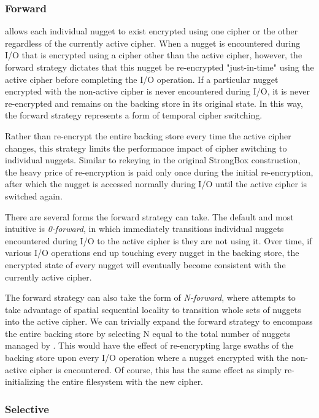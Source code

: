 \subsubsection{Forward}

\SYSTEM{} allows each individual nugget to exist encrypted using one cipher or
the other regardless of the currently active cipher. When a nugget is
encountered during I/O that is encrypted using a cipher other than the active
cipher, however, the forward strategy dictates that this nugget be re-encrypted
"just-in-time" using the active cipher before completing the I/O operation. If a
particular nugget encrypted with the non-active cipher is never encountered
during I/O, it is never re-encrypted and remains on the backing store in its
original state. In this way, the forward strategy represents a form of temporal
cipher switching.

Rather than re-encrypt the entire backing store every time the active cipher
changes, this strategy limits the performance impact of cipher switching to
individual nuggets. Similar to rekeying in the original StrongBox construction,
the heavy price of re-encryption is paid only once during the initial
re-encryption, after which the nugget is accessed normally during I/O until the
active cipher is switched again.

There are several forms the forward strategy can take. The default and most
intuitive is \emph{0-forward}, in which \SYSTEM{} immediately transitions
individual nuggets encountered during I/O to the active cipher is they are not
using it. Over time, if various I/O operations end up touching every nugget in
the backing store, the encrypted state of every nugget will eventually become
consistent with the currently active cipher.

The forward strategy can also take the form of \emph{N-forward}, where \SYSTEM{}
attempts to take advantage of spatial sequential locality to transition whole
sets of nuggets into the active cipher. We can trivially expand the forward
strategy to encompass the entire backing store by selecting N equal to the total
number of nuggets managed by \SYSTEM{}. This would have the effect of
re-encrypting large swaths of the backing store upon every I/O operation where a
nugget encrypted with the non-active cipher is encountered. Of course, this has
the same effect as simply re-initializing the entire filesystem with the new
cipher.

\subsubsection{Selective}

